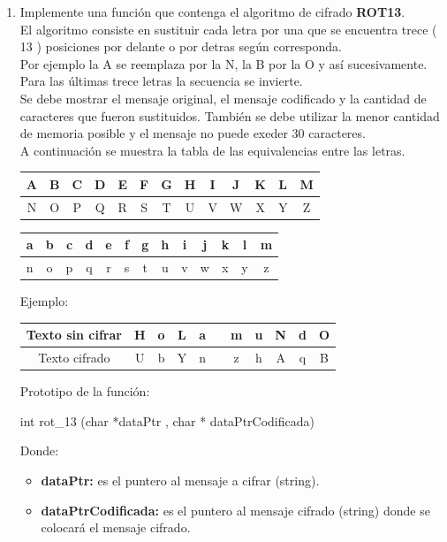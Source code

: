 \documentclass[12pt]{article} %
\begin{document}
\begin{enumerate}
\item Implemente una función que contenga el algoritmo de cifrado {\bf ROT13}. \\
El algoritmo consiste en sustituir cada letra por una que se encuentra trece ( 13 ) posiciones por delante o por detras según corresponda. \\
Por ejemplo la A se reemplaza por la N, la B por la O y así sucesivamente. Para las últimas trece letras la secuencia se invierte.\\
{\color{red}Se debe mostrar el mensaje original, el mensaje codificado y la cantidad de caracteres que fueron sustituidos}. También se debe utilizar la menor cantidad de memoria posible y el mensaje no puede exeder 30 caracteres.\\
 A continuación se muestra la tabla de las equivalencias entre las letras.
\noindent
  \begin{center}
   \begin{tabular}{| c | c | c | c | c | c | c | c | c | c | c | c | c |}
    \hline
     A & B & C & D & E & F & G & H & I & J & K & L & M \\ \hline 
     N & O & P & Q & R & S & T & U & V & W & X & Y & Z \\ \hline 
   \end{tabular}	
  \end{center}

  \begin{center}
   \begin{tabular}{| c | c | c | c | c | c | c | c | c | c | c | c | c |}
    \hline
     a & b & c & d & e & f & g & h & i & j & k & l & m \\ \hline 
     n & o & p & q & r & s & t & u & v & w & x & y & z \\ \hline 
   \end{tabular}	
  \end{center}

Ejemplo:
\noindent
\vspace{-0.6cm}
  \begin{center}
   \begin{tabular}{| c | c | c | c | c | c | c | c | c | c | c |}
    \hline
     Texto sin cifrar & H & o & L & a &   & m & u & N & d & O  \\ \hline 
     Texto cifrado    & U & b & Y & n &   & z & h & A & q & B  \\ \hline 
   \end{tabular}	
  \end{center}
Prototipo de la función:
\begin{center}
{\color{blue}int} rot\_13 ({\color{blue}char} *dataPtr , {\color{blue}char} * dataPtrCodificada)
\end{center}
Donde:
\begin{itemize}
\item {\bf dataPtr:} es el puntero al mensaje a cifrar (string).
\item {\bf dataPtrCodificada:} es el puntero al mensaje cifrado (string) donde se colocará el mensaje cifrado.
\end{itemize}


\end{enumerate}
\end{document}

